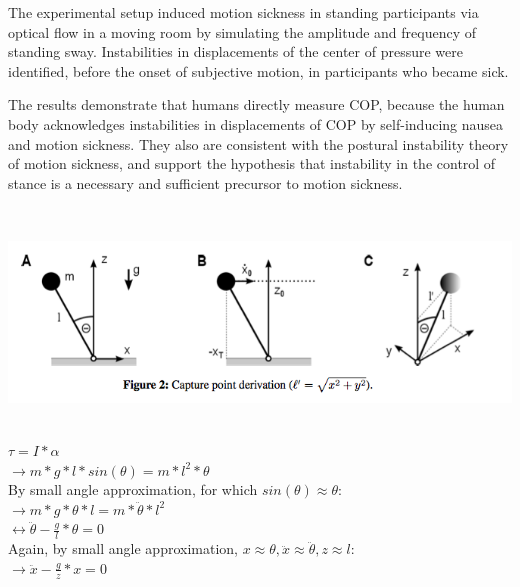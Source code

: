 \documentclass{article}
\newcommand{\questionhead}[1]
  {\bigskip\bigskip
   \noindent{\LARGE\bf Question #1}
   \bigskip}
\begin{document}
The experimental setup induced motion sickness in standing participants via optical flow in a moving room by simulating the amplitude and frequency of standing sway. Instabilities in displacements of the center of pressure were identified, before the onset of subjective motion, in participants who became sick. 

The results demonstrate that humans directly measure COP, because the human body acknowledges instabilities in displacements of COP by self-inducing nausea and motion sickness. They also are consistent with the postural instability theory of motion sickness, and support the hypothesis that instability in the control of stance is a necessary and sufficient precursor to motion sickness.

\questionhead{3}

\\

\begin{center}
\includegraphics[scale=0.75]{fig2.png}
\end{center}

\\

$\tau = I*\alpha$\\
$\rightarrow m*g*l*sin(\theta) = m*l^2*\theta$\\
By small angle approximation, for which $sin(\theta) \approx \theta$:\\
$\rightarrow m*g*\theta*l = m*\ddot{\theta}*l^2 $\\
$\leftrightarrow \ddot{\theta} - \frac{g}{l}*\theta = 0$\\
Again, by small angle approximation, $x \approx \theta, \ddot{x} \approx \ddot{\theta}, z  \approx l$:\\
$\rightarrow \ddot{x} - \frac{g}{z}*x = 0$\\
\end{document}
